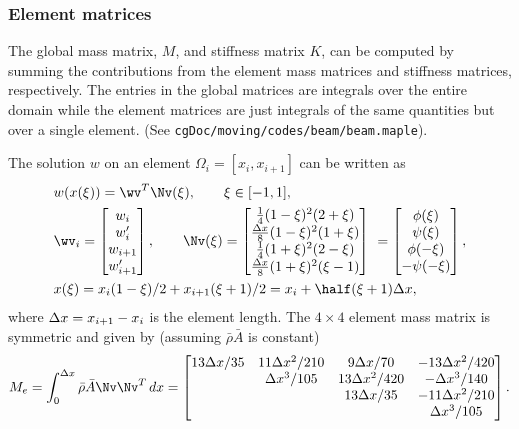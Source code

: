 \documentclass[11pt]{article}
\newcommand{\rhos}{\bar{\rho}}
\newcommand{\As}{\bar{A}}
\begin{document}
\subsubsection{Element matrices}

The global mass matrix, $M$, and stiffness matrix $K$, can be computed by summing the contributions
from the element mass matrices and stiffness matrices, respectively. The entries in the global matrices are
integrals over the entire domain while the element matrices are just integrals of the same quantities but over a single element.
(See {\tt cgDoc/moving/codes/beam/beam.maple}).

The solution $w$ on an element $\Omega_i=[x_i,x_{i+1}]$ can be written as
\begin{align}
&  w(x(\xi)) =  \wv^T \Nv(\xi), \qquad \xi\in[-1,1], \\
&  \wv_i = \begin{bmatrix} 
               w_i \\  w'_i \\ w_{i+1} \\ w'_{i+1}
              \end{bmatrix},
\qquad 
\Nv(\xi) = \begin{bmatrix} 
               \frac{1}{4} (1-\xi)^2 (2+\xi) \\
               \frac{\dx}{8} (1-\xi)^2 (1+\xi) \\
               \frac{1}{4} (1+\xi)^2 (2-\xi) \\
               \frac{\dx}{8} (1+\xi)^2 (\xi-1) 
              \end{bmatrix}
  ~= \begin{bmatrix} \phi(\xi) \\ \psi(\xi) \\ \phi(-\xi) \\ -\psi(-\xi) \end{bmatrix}, \\
&  x(\xi) = x_i (1-\xi)/2 + x_{i+1}( \xi+1)/2 = x_i + \half(\xi+1)\dx , 
\end{align} 
where $\Delta x=x_{i+1}-x_i$ is the element length. 
% 
The $4\times 4$ element mass matrix is symmetric and given by (assuming $\rhos\As$ is constant)
\begin{align}
   M_e = \int_0^{\dx} \rhos \As \Nv \Nv^T \, dx = 
% 
\begin{bmatrix}
13\dx/35 & 11\dx^2/210 & 9\dx/70      & -13\dx^2/420 \\
         & \dx^3/105   & 13\dx^2/420  & -\dx^3/140   \\
         &             & 13\dx/35     & -11\dx^2/210 \\
         &             &              & \dx^3/105
\end{bmatrix}.
%
\end{align} 
\end{document}
